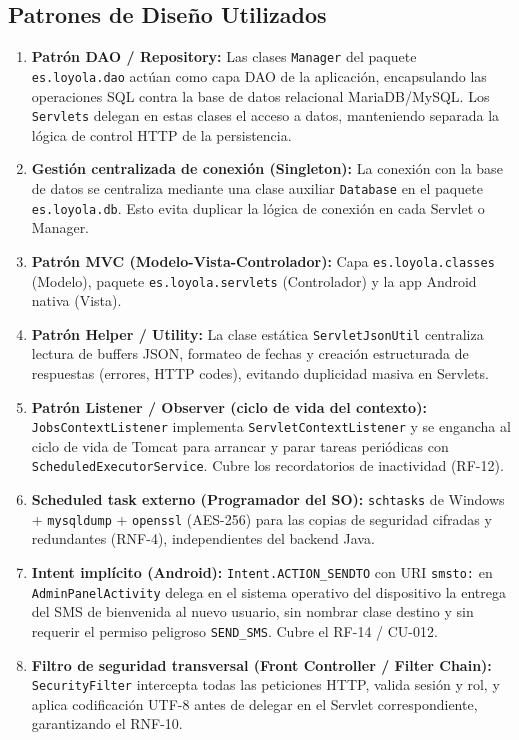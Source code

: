 \documentclass{report}
\begin{document}
\subsection{Patrones de Diseño Utilizados}
\begin{enumerate}
    \item \textbf{Patrón DAO / Repository:} Las clases \texttt{Manager} del paquete \texttt{es.loyola.dao} actúan como capa DAO de la aplicación, encapsulando las operaciones SQL contra la base de datos relacional MariaDB/MySQL. Los \texttt{Servlets} delegan en estas clases el acceso a datos, manteniendo separada la lógica de control HTTP de la persistencia.
    \item \textbf{Gestión centralizada de conexión (Singleton):} La conexión con la base de datos se centraliza mediante una clase auxiliar \texttt{Database} en el paquete \texttt{es.loyola.db}. Esto evita duplicar la lógica de conexión en cada Servlet o Manager.
    \item \textbf{Patrón MVC (Modelo-Vista-Controlador):} Capa \texttt{es.loyola.classes} (Modelo), paquete \texttt{es.loyola.servlets} (Controlador) y la app Android nativa (Vista).
    \item \textbf{Patrón Helper / Utility:} La clase estática \texttt{ServletJsonUtil} centraliza lectura de buffers JSON, formateo de fechas y creación estructurada de respuestas (errores, HTTP codes), evitando duplicidad masiva en Servlets.
    \item \textbf{Patrón Listener / Observer (ciclo de vida del contexto):} \texttt{JobsContextListener} implementa \texttt{ServletContextListener} y se engancha al ciclo de vida de Tomcat para arrancar y parar tareas periódicas con \texttt{ScheduledExecutorService}. Cubre los recordatorios de inactividad (RF-12).
    \item \textbf{Scheduled task externo (Programador del SO):} \texttt{schtasks} de Windows + \texttt{mysqldump} + \texttt{openssl} (AES-256) para las copias de seguridad cifradas y redundantes (RNF-4), independientes del backend Java.
    \item \textbf{Intent implícito (Android):} \texttt{Intent.ACTION\_SENDTO} con URI \texttt{smsto:} en \texttt{AdminPanelActivity} delega en el sistema operativo del dispositivo la entrega del SMS de bienvenida al nuevo usuario, sin nombrar clase destino y sin requerir el permiso peligroso \texttt{SEND\_SMS}. Cubre el RF-14 / CU-012.
    \item \textbf{Filtro de seguridad transversal (Front Controller / Filter Chain):} \texttt{SecurityFilter} intercepta todas las peticiones HTTP, valida sesión y rol, y aplica codificación UTF-8 antes de delegar en el Servlet correspondiente, garantizando el RNF-10.
\end{enumerate}
\end{document}
